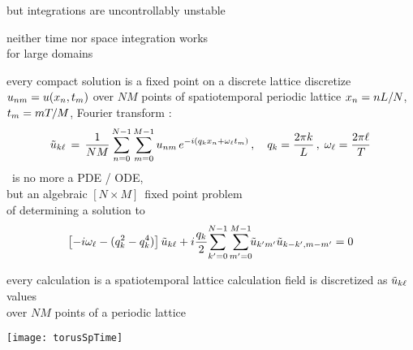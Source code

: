 \begin{frame}{but integrations are uncontrollably unstable}
\begin{center}
{\huge neither} time {\huge nor} space integration {\huge works} \\
for large domains
\end{center}

\vfill
\color{red}{rethink the calculation}
\end{frame}


\begin{frame}{every compact solution is a fixed point on a discrete lattice}
discretize $u_{nm} = u(x_n,t_m)$ over
$N M$ points of spatiotemporal periodic lattice $x_n = n L/N$,
 $t_m = m {T_{}}/M$, Fourier transform :
%
\[
\tilde{u}_{k\ell} \,=\,
  \frac{1}{NM} \sum^{N-1}_{n=0} \sum^{M-1}_{m=0}
  u_{nm} \, e^{-i(q_kx_n + \omega_\ell t_m)}
    \,,\quad
q_k = \frac{2 \pi k}{L}
    \,,\;
\omega_\ell = \frac{2 \pi \ell}{{T_{}}}
\]
\KS\ is no more a PDE / ODE, \\
but an algebraic $[N\!\times\!M]$\dmn\ fixed point problem \\
of determining a solution to
\[
\left[- i \omega_\ell - ( q_k^2 - q_k^4 ) \right]\tilde{u}_{k\ell}
+ i \frac{q_k}{2} \!\sum_{k'=0}^{N-1} \sum^{M-1}_{m'=0}\!\!
\tilde{u}_{k'm'} \tilde{u}_{k-k',m-m'}
    =
0
\]
\end{frame}

\begin{frame}{every calculation is a spatiotemporal lattice calculation}
field is discretized as
$\tilde{u}_{k\ell}$ values  \\ over
$N M$ points of a periodic lattice


\begin{center}
\texttt{[image: torusSpTime]}
\end{center}
\end{frame}


